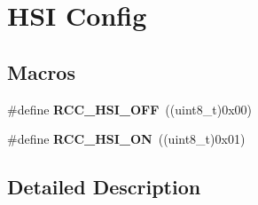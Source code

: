 \hypertarget{group___r_c_c___h_s_i___config}{}\section{H\+SI Config}
\label{group___r_c_c___h_s_i___config}
\subsection*{Macros}
\begin{DoxyCompactItemize}
\item 
\#define {\bfseries R\+C\+C\+\_\+\+H\+S\+I\+\_\+\+O\+FF}~((uint8\+\_\+t)0x00)\hypertarget{group___r_c_c___h_s_i___config_ga1b34d37d3b51afec0758b3ddc7a7e665}{}\label{group___r_c_c___h_s_i___config_ga1b34d37d3b51afec0758b3ddc7a7e665}

\item 
\#define {\bfseries R\+C\+C\+\_\+\+H\+S\+I\+\_\+\+ON}~((uint8\+\_\+t)0x01)\hypertarget{group___r_c_c___h_s_i___config_ga0bf09ef9e46d5da25cced7b3122f92f5}{}\label{group___r_c_c___h_s_i___config_ga0bf09ef9e46d5da25cced7b3122f92f5}

\end{DoxyCompactItemize}


\subsection{Detailed Description}
